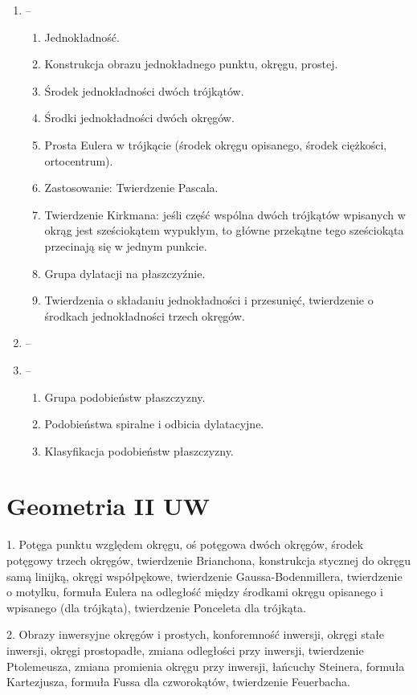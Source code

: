 \documentclass{parchment}
\begin{document}
\begin{enumerate}
\begin{enumerate}
	\end{enumerate}
	\item -- \begin{enumerate}
		\item Jednokładność.
		\item Konstrukcja obrazu jednokładnego punktu, okręgu, prostej.
		\item Środek jednokładności dwóch trójkątów.
		\item Środki jednokładności dwóch okręgów.
		\item Prosta Eulera w trójkącie (środek okręgu opisanego, środek ciężkości, ortocentrum).
		\item Zastosowanie: Twierdzenie Pascala.
		\item Twierdzenie Kirkmana: jeśli część wspólna dwóch trójkątów wpisanych w okrąg jest sześciokątem wypukłym, to główne przekątne tego sześciokąta przecinają się w jednym punkcie.
		\item Grupa dylatacji na płaszczyźnie.
		\item Twierdzenia o składaniu jednokładności i przesunięć, twierdzenie o środkach jednokładności trzech okręgów.
	\end{enumerate}
	\item -- 
	\item -- \begin{enumerate}
		\item Grupa podobieństw płaszczyzny.
		\item Podobieństwa spiralne i odbicia dylatacyjne.
		\item Klasyfikacja podobieństw płaszczyzny.
	\end{enumerate}
\end{enumerate}

\section{Geometria II UW}
1. Potęga punktu względem okręgu, oś potęgowa dwóch okręgów, środek potęgowy trzech okręgów, twierdzenie Brianchona, konstrukcja stycznej do okręgu samą linijką, okręgi współpękowe, twierdzenie Gaussa-Bodenmillera, twierdzenie o motylku, formuła Eulera na odległość między środkami okręgu opisanego i wpisanego (dla trójkąta), twierdzenie Ponceleta dla trójkąta.

2. Obrazy inwersyjne okręgów i prostych, konforemność inwersji, okręgi stałe inwersji, okręgi prostopadłe, zmiana odległości przy inwersji, twierdzenie Ptolemeusza, zmiana promienia okręgu przy inwersji, łańcuchy Steinera, formuła Kartezjusza, formuła Fussa dla czworokątów, twierdzenie Feuerbacha.
\end{document}
